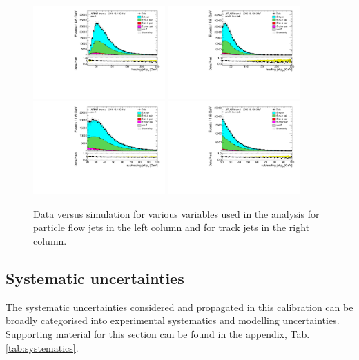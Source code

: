 \documentclass[letterpaper,12pt]{article}
\begin{document}
\begin{figure}%
		\centering
		\includegraphics[width=0.45\textwidth]{figs_support/plots_def/DataMC_h_J0_pt_all.pdf}
		\includegraphics[width=0.45\textwidth]{figs_support/plots_def/DataMC_h_tjet_J0_pt_all.pdf}\\
		\includegraphics[width=0.45\textwidth]{figs_support/plots_def/DataMC_h_J1_pt_all.pdf}
		\includegraphics[width=0.45\textwidth]{figs_support/plots_def/DataMC_h_tjet_J1_pt_all.pdf}\\
		\caption{Data versus simulation for various variables used in the analysis for 
		particle flow jets in the left column and for track jets in the right column.}
		\label{fig:kinematic_distributions_combined}
\end{figure}
		

\subsection{Systematic uncertainties}
\label{systematic uncertainties}
The systematic uncertainties considered and propagated in this calibration 
can be broadly categorised into experimental systematics and modelling uncertainties. 
Supporting material for this section can be found in the appendix, Tab.\ref{tab:systematics}.
\end{document}
